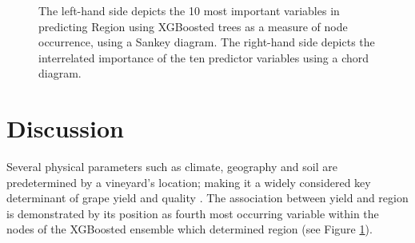\documentclass[review,12pt,authoryear]{elsarticle}
\begin{document}
\begin{linenumbers}
\begin{figure}
 \caption{The left-hand side depicts the 10 most important variables in predicting Region using XGBoosted trees as a measure of node occurrence, using a Sankey diagram. The right-hand side depicts the interrelated importance of the ten predictor variables using a chord diagram.}\label{fig:region_sankey}
\end{figure}

\section{Discussion}

%

Several physical parameters such as climate, geography and soil are predetermined by a vineyard's location; making it a widely considered key determinant of grape yield and quality \citep{abbalDecisionSupportSystem2016,agostaRegionalClimateVariability2012,fragaMultivariateClusteringViticultural2017}. 
The association between yield and region is demonstrated by its position as fourth most occurring variable within the nodes of the XGBoosted ensemble which determined region (see Figure \ref{fig:region_sankey}). %


\end{linenumbers}
\end{document}

